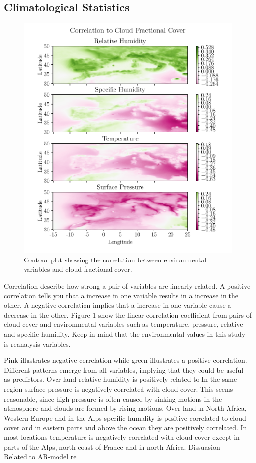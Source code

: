 \subsection{Climatological Statistics}
\begin{figure}[ht]
    \centering
    \includegraphics{python_figs/correlation_figure.pdf}
    \caption{Contour plot showing the correlation between environmental variables and cloud fractional cover. }
    \label{fig:correlation_tcc_vs_envio}
\end{figure}
Correlation describe how strong a pair of variables are linearly related. A positive correlation tells you that a increase in one variable results in a increase in the other. A negative correlation implies that a increase in one variable cause a decrease in the other. Figure \ref{fig:correlation_tcc_vs_envio} show the linear correlation coefficient from pairs of cloud cover and environmental variables such as temperature, pressure, relative and specific humidity.
Keep in mind that the environmental values in this study is reanalysis variables. 

Pink illustrates negative correlation while green illustrates a positive correlation. Different patterns emerge from all variables, implying that they could be useful as predictors. Over land relative humidity is positively related to 
In the same region surface pressure is negatively correlated with cloud cover. This seems reasonable, since high pressure is often caused by sinking motions in the atmosphere and clouds are formed by rising motions. Over land in North Africa, Western Europe and in the Alps specific humidity is positive correlated to cloud cover and in eastern parts and above the ocean they are positively correlated. In most locations temperature is negatively correlated with cloud cover except in parts of the Alps, north coast of France and in north Africa. 
Dissuasion  --- Related to AR-model re

